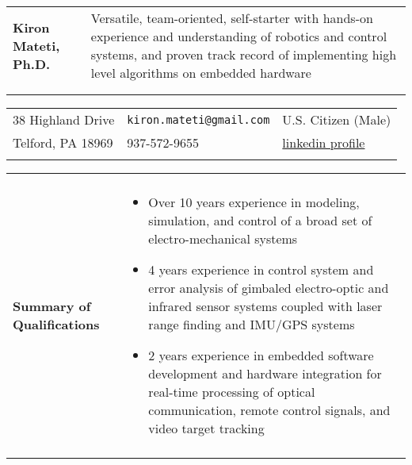\documentclass{article}[16pt]
\newlength{\lcolw}
\newlength{\rcolw}
\newlength{\itemmargin}
\begin{document}
\begin{tabular}{L{\lcolw} L{\rcolw}}
\textbf{\LARGE {Kiron Mateti, Ph.D.}} & {\large Versatile, team-oriented, self-starter with hands-on experience and understanding of robotics and control systems, and proven track record of implementing high level algorithms on embedded hardware} \\  \\
\hline \hline \\ 
\end{tabular}

\vspace{-0.1in}

\begin{tabular} {L{2in}  L{2.5in} L{2in}}
38 Highland Drive & {\tt  kiron.mateti@gmail.com} & U.S. Citizen (Male) \\
Telford, PA 18969 & 937-572-9655 & \href{http://www.linkedin.com/in/kiron-mateti-b691152}{linkedin profile}
\\ \\
\end{tabular}

\vspace{-0.1in}

\begin{tabular}{L{\lcolw}  L{\rcolw}}
 \hline \hline \\
\textbf{\Large Summary of Qualifications} &
\vspace{-0.3in} 
 \begin{itemize}[leftmargin = \itemmargin]

	\item Over 10 years experience in modeling, simulation, and control of a broad set of electro-mechanical systems
	
	\item 4 years experience in control system and error analysis of gimbaled electro-optic and infrared sensor systems coupled with laser range finding and IMU/GPS systems
	
	\item 2 years experience in embedded software development and hardware integration for real-time processing of optical communication, remote control signals, and video target tracking
	
	\end{itemize}\\
 \hline \\ 
\end{tabular}
\end{document}
